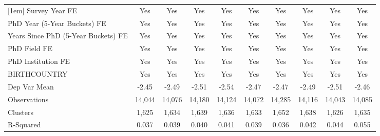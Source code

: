 \begin{table}[htbp]
\begin{tabular}{l*{9}{c}}
[1em]
Survey Year FE&         Yes         &         Yes         &         Yes         &         Yes         &         Yes         &         Yes         &         Yes         &         Yes         &         Yes         \\
[1em]
PhD Year (5-Year Buckets) FE&         Yes         &         Yes         &         Yes         &         Yes         &         Yes         &         Yes         &         Yes         &         Yes         &         Yes         \\
[1em]
Years Since PhD (5-Year Buckets) FE&         Yes         &         Yes         &         Yes         &         Yes         &         Yes         &         Yes         &         Yes         &         Yes         &         Yes         \\
[1em]
PhD Field FE&         Yes         &         Yes         &         Yes         &         Yes         &         Yes         &         Yes         &         Yes         &         Yes         &         Yes         \\
[1em]
PhD Institution FE&         Yes         &         Yes         &         Yes         &         Yes         &         Yes         &         Yes         &         Yes         &         Yes         &         Yes         \\
[1em]
BIRTHCOUNTRY&         Yes         &         Yes         &         Yes         &         Yes         &         Yes         &         Yes         &         Yes         &         Yes         &         Yes         \\
\hline
Dep Var Mean&       -2.45         &       -2.49         &       -2.51         &       -2.54         &       -2.47         &       -2.47         &       -2.49         &       -2.51         &       -2.46         \\
Observations&      14,044         &      14,076         &      14,180         &      14,124         &      14,072         &      14,285         &      14,116         &      14,043         &      14,085         \\
Clusters&       1,625         &       1,634         &       1,639         &       1,636         &       1,633         &       1,652         &       1,638         &       1,626         &       1,635         \\
R-Squared&       0.037         &       0.039         &       0.040         &       0.041         &       0.039         &       0.036         &       0.042         &       0.044         &       0.055         \\

\end{tabular}
\end{table}
